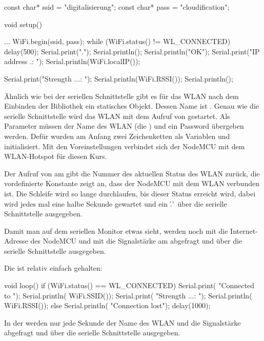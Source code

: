 
\begin{src}
const char* ssid 
  = "digitalisierung";
const char* pass 
  = "cloudification";

void setup() {
  ...
  WiFi.begin(ssid, pass);
  while (WiFi.status() 
    != WL_CONNECTED) 
  {
    delay(500);
    Serial.print(".");
  }
  Serial.println();
  Serial.println("OK");
  Serial.print("IP address .: ");
  Serial.println(WiFi.localIP());

  Serial.print("Strength ...: ");
  Serial.println(WiFi.RSSI());
  Serial.println();   
}
\end{src}

Ähnlich wie bei der seriellen Schnittstelle gibt es für das WLAN nach dem Einbinden der Bibliothek
ein statisches Objekt. Dessen Name ist . Genau wie die serielle Schnittstelle wird das
WLAN mit dem Aufruf von  gestartet. Als Parameter müssen der Name des WLAN (die )
und ein Password übergeben werden. Defür wurden am Anfang zwei Zeichenketten als Variablen
 und  initialisiert. Mit den Voreinstellungen verbindet sich der NodeMCU mit 
dem WLAN-Hotspot für diesen Kurs.

Der Aufruf von  am  gibt die Nummer des aktuellen Status des WLAN zurück, 
die vordefinierte Konstante  zeigt an, dass der NodeMCU mit dem WLAN verbunden ist.
Die Schleife wird so lange durchlaufen, bis dieser Status erreicht wird, dabei wird jedes mal eine 
halbe Sekunde gewartet und ein \'.'\ über die serielle Schnittstelle ausgegeben.

Damit man auf dem seriellen Monitor etwas sieht, werden noch mit  die Internet-Adresse des 
NodeMCU und mit  die Signalstärke am  abgefragt und über die serielle Schnittstelle
ausgegeben.

\pagebreak
Die  ist relativ einfach gehalten:
\begin{src}
void loop() {
  if (WiFi.status() 
    == WL_CONNECTED)
  {
    Serial.print(
      "Connected to ");
    Serial.println(
      WiFi.SSID());
    Serial.print(
      "Strength ...: ");
    Serial.println(
      WiFi.RSSI());
  }
  else
  {
    Serial.println(
      "Connection lost");
  }
  delay(1000);
}
\end{src}
In der  werden nur jede Sekunde der Name des WLAN und die Signalstärke abgefragt und über die
serielle Schnittstelle ausgegeben.

